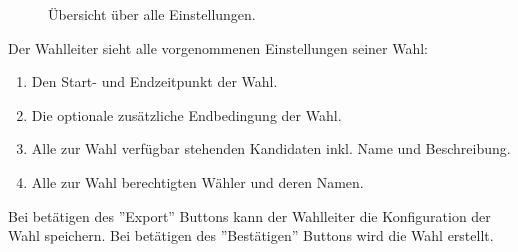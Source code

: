 \documentclass[parskip=full,11pt,twoside]{scrartcl}
\begin{document}
\begin{figure}[H]
	\caption{\label{fig:wlltr-done}
		Übersicht über alle Einstellungen.
	}
\end{figure}
Der Wahlleiter sieht alle vorgenommenen Einstellungen seiner Wahl:
\begin{enumerate}
	\item Den Start- und Endzeitpunkt der Wahl.
	\item Die optionale zusätzliche Endbedingung der Wahl.
	\item Alle zur Wahl verfügbar stehenden Kandidaten inkl. Name und Beschreibung.
	\item Alle zur Wahl berechtigten Wähler und deren Namen.
\end{enumerate}
Bei betätigen des ''Export'' Buttons kann der Wahlleiter die Konfiguration der Wahl speichern.
Bei betätigen des ''Bestätigen'' Buttons wird die Wahl erstellt.
\end{document}
